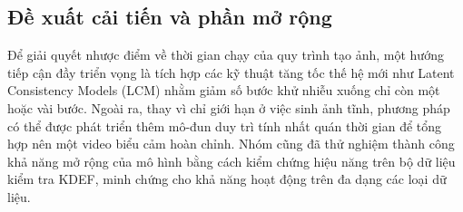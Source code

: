 \subsection{Đề xuất cải tiến và phần mở rộng}
Để giải quyết nhược điểm về thời gian chạy của quy trình tạo ảnh, một hướng tiếp cận đầy triển vọng là tích hợp các kỹ thuật tăng tốc thế hệ mới như Latent Consistency Models (LCM) nhằm giảm số bước khử nhiễu xuống chỉ còn một hoặc vài bước. Ngoài ra, thay vì chỉ giới hạn ở việc sinh ảnh tĩnh, phương pháp có thể được phát triển thêm mô-đun duy trì tính nhất quán thời gian để tổng hợp nên một video biểu cảm hoàn chỉnh. Nhóm cũng đã thử nghiệm thành công khả năng mở rộng của mô hình bằng cách kiểm chứng hiệu năng trên bộ dữ liệu kiểm tra KDEF, minh chứng cho khả năng hoạt động trên đa dạng các loại dữ liệu.
